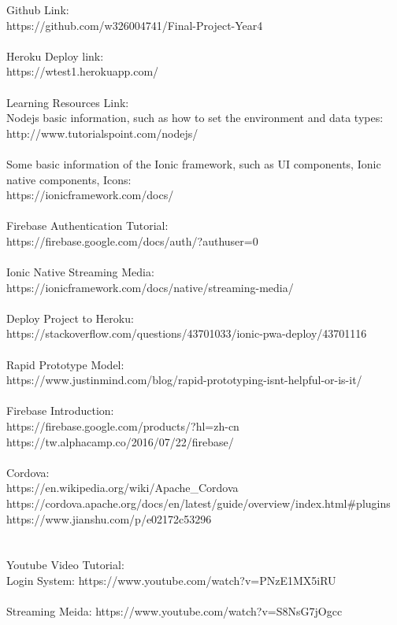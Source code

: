 Github Link: \\ https://github.com/w326004741/Final-Project-Year4 \\ \\ Heroku Deploy link: \\ https://wtest1.herokuapp.com/ 
\\ \\ 
Learning Resources Link: \\
Nodejs basic information, such as how to set the environment and data types:\\
http://www.tutorialspoint.com/nodejs/
\\ \\ 
Some basic information of the Ionic framework, such as UI components, Ionic native components, Icons: \\
https://ionicframework.com/docs/
\\ \\
Firebase Authentication Tutorial: \\
https://firebase.google.com/docs/auth/?authuser=0
\\ \\
Ionic Native Streaming Media: \\
https://ionicframework.com/docs/native/streaming-media/
\\ \\ 
Deploy Project to Heroku: \\
https://stackoverflow.com/questions/43701033/ionic-pwa-deploy/43701116
\\ \\
Rapid Prototype Model:\\ 
https://www.justinmind.com/blog/rapid-prototyping-isnt-helpful-or-is-it/
\\ \\
Firebase Introduction: \\
https://firebase.google.com/products/?hl=zh-cn\\
https://tw.alphacamp.co/2016/07/22/firebase/
\\ \\
Cordova: \\
https://en.wikipedia.org/wiki/Apache\_{}Cordova 
\\
https://cordova.apache.org/docs/en/latest/guide/overview/index.html#plugins
\\
https://www.jianshu.com/p/e02172c53296
\\ 
\\ \\
Youtube Video Tutorial: \\
Login System: https://www.youtube.com/watch?v=PNzE1MX5iRU
\\ \\
Streaming Meida: https://www.youtube.com/watch?v=S8NsG7jOgcc